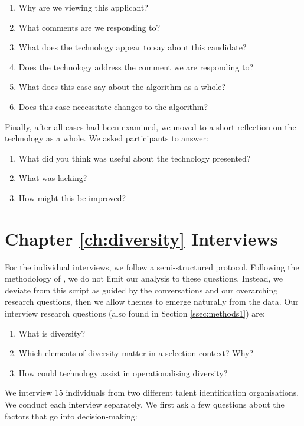 \begin{enumerate}
    \item Why are we viewing this applicant?
    \item What comments are we responding to?
    \item What does the technology appear to say about this candidate?
    \item Does the technology address the comment we are responding to?
    \item What does this case say about the algorithm as a whole?
    \item Does this case necessitate changes to the algorithm?
\end{enumerate}

Finally, after all cases had been examined, we moved to a short reflection on the technology as a whole. We asked participants to answer:

\begin{enumerate}
    \item What did you think was useful about the technology presented?
    \item What was lacking?
    \item How might this be improved?
\end{enumerate}


\section{Chapter \ref{ch:diversity} Interviews}\label{app:divprotocol1}
For the individual interviews, we follow a semi-structured protocol. Following the methodology of \textcite{braun_using_2006}, we do not limit our analysis to these questions. Instead, we deviate from this script as guided by the conversations and our overarching research questions, then we allow themes to emerge naturally from the data. Our interview research questions (also found in Section \ref{ssec:methods1}) are:

\begin{enumerate}
    \item What is diversity?
    \item Which elements of diversity matter in a selection context? Why?
    \item How could technology assist in operationalising diversity?
\end{enumerate}

We interview 15 individuals from two different talent identification organisations. We conduct each interview separately. We first ask a few questions about the factors that go into decision-making:

